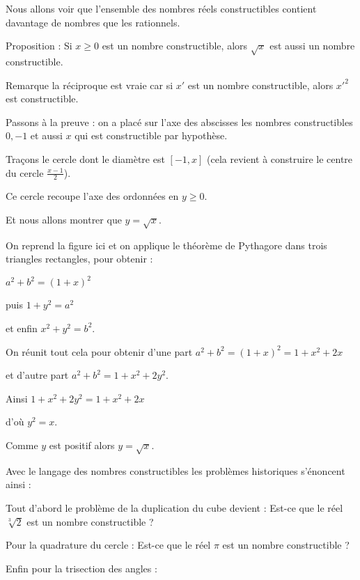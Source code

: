 \diapo

Nous allons voir que l'ensemble des nombres réels constructibles
contient davantage de nombres que les rationnels.

Proposition : Si $x\ge 0$ est un nombre constructible, alors $\sqrt x$ est aussi un nombre constructible.


Remarque la réciproque est vraie car si $x'$ est un nombre constructible, alors $x'^2$ est constructible.

\change
Passons à la preuve : on a placé sur l'axe des abscisses 
les nombres constructibles $0,-1$ et aussi $x$ qui est constructible par hypothèse.

\change

\change
Traçons le cercle dont le diamètre est $[-1,x]$ 
(cela revient à construire le centre du cercle $\frac{x-1}{2}$).

\change
Ce cercle recoupe l'axe des ordonnées en $y\ge0$. 

Et nous allons montrer que $y = \sqrt x$.

\change

\change
On reprend la figure ici et on applique le théorème 
de Pythagore dans trois triangles rectangles, pour obtenir :

\change
$a^2+b^2 =(1+x)^2$

\change
puis $1+y^2 = a^2$

\change
et enfin $x^2+y^2 = b^2.$

\change
On réunit tout cela pour obtenir d'une part 
$a^2+b^2 = (1+x)^2 = 1 + x^2 + 2x$ 

\change
et d'autre part $a^2+b^2 = 1 + x^2 + 2y^2$.

\change
Ainsi $1+x^2+2y^2 = 1 + x^2+2x$ 

\change
d'où $y^2=x$. 

\change
Comme $y$ est positif alors $y = \sqrt{x}$.

\diapo
Avec le langage des nombres constructibles les problèmes historiques s'énoncent 
ainsi :
 
 \change
 Tout d'abord le problème de la duplication du cube devient : 
 Est-ce que le réel $\sqrt[3]{2}$ est un nombre constructible ?
  
  \change
  Pour la quadrature du cercle : Est-ce que le réel $\pi$ est un nombre constructible ?
  
  \change
  Enfin pour la trisection des angles :
  
